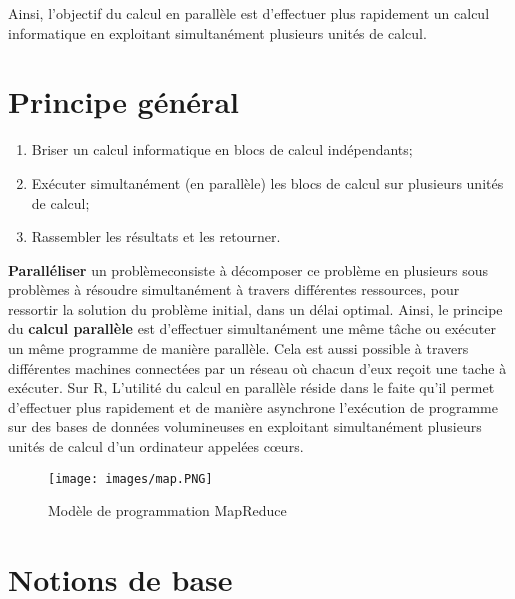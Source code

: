 \documentclass[
]{article}
\begin{document}
Ainsi, l'objectif du calcul en parallèle est d'effectuer plus rapidement
un calcul informatique en exploitant simultanément plusieurs unités de
calcul.

\hypertarget{principe-guxe9nuxe9ral}{%
\section{Principe général}\label{principe-guxe9nuxe9ral}}

\begin{enumerate}
\def\labelenumi{\arabic{enumi}.}
\item
  Briser un calcul informatique en blocs de calcul indépendants;
\item
  Exécuter simultanément (en parallèle) les blocs de calcul sur
  plusieurs unités de calcul;
\item
  Rassembler les résultats et les retourner.
\end{enumerate}

\textbf{Paralléliser} un problèmeconsiste à décomposer ce problème en
plusieurs sous problèmes à résoudre simultanément à travers différentes
ressources, pour ressortir la solution du problème initial, dans un
délai optimal. Ainsi, le principe du \textbf{calcul parallèle} est
d'effectuer simultanément une même tâche ou exécuter un même programme
de manière parallèle. Cela est aussi possible à travers différentes
machines connectées par un réseau où chacun d'eux reçoit une tache à
exécuter. Sur R, L'utilité du calcul en parallèle réside dans le faite
qu'il permet d'effectuer plus rapidement et de manière asynchrone
l'exécution de programme sur des bases de données volumineuses en
exploitant simultanément plusieurs unités de calcul d'un ordinateur
appelées cœurs.

\begin{figure}
\centering
\texttt{[image: images/map.PNG]}
\caption{Modèle de programmation MapReduce}
\end{figure}

\hypertarget{notions-de-base}{%
\section{Notions de base}\label{notions-de-base}}
\end{document}
